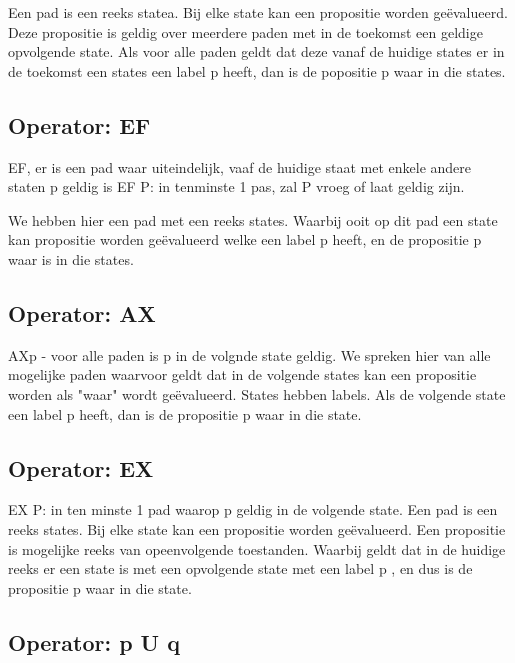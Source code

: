 \documentclass{article}
\begin{document}
	Een pad is een reeks statea. Bij elke state kan een propositie worden geëvalueerd. Deze propositie is geldig over meerdere paden met in de toekomst een geldige  opvolgende  state.
	Als voor alle paden geldt dat deze vanaf de huidige states er in  de toekomst een states een label p heeft, dan is de popositie p waar in die states.
	
	
	\subsection{Operator: EF}
	EF, er is een pad waar uiteindelijk, vaaf de huidige staat  met enkele andere staten p geldig is
	EF P: in tenminste 1 pas, zal P vroeg of laat geldig zijn.
	
	We hebben hier een pad met een reeks states. Waarbij ooit op dit pad een state kan  propositie worden geëvalueerd welke  een label p heeft,  en de propositie p waar is in die states.
	\subsection{Operator: AX}
	AXp - voor alle paden is p in de volgnde state geldig.
	We spreken hier van alle mogelijke paden waarvoor geldt dat in de volgende states kan een propositie worden als "waar" wordt geëvalueerd. 
	States hebben labels. Als de volgende state een label p heeft, dan is de propositie p waar in die state.
	\subsection{Operator: EX}
	EX P: in ten minste 1 pad waarop p geldig in de volgende state.	
	Een pad is een reeks states. Bij elke state kan een propositie worden geëvalueerd. Een propositie is  mogelijke reeks van opeenvolgende toestanden.
	Waarbij geldt dat in de huidige reeks er een state is met een opvolgende state met een label p , en dus is de propositie p waar in die state.
	\subsection{Operator: p U q}
	
\end{document}
